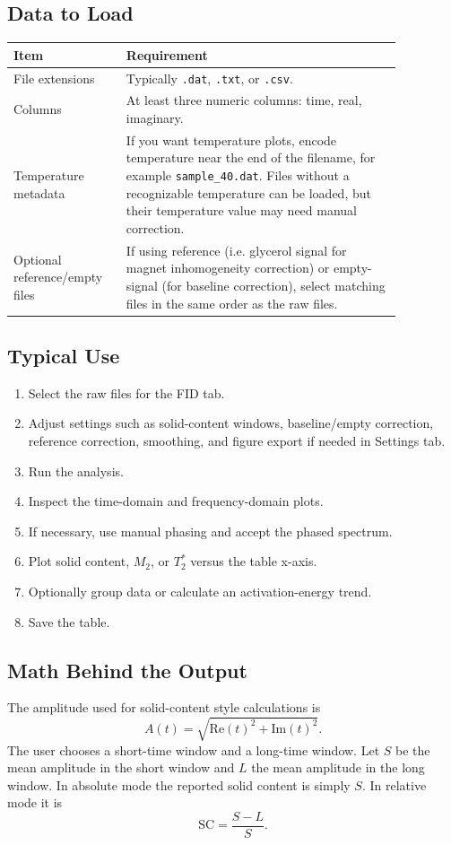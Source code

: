 \documentclass[11pt,a4paper]{article}
\newcommand{\TtwoStar}{\ensuremath{T_2^{\ast}}}
\newcommand{\Mtwo}{\ensuremath{M_2}}
\begin{document}
\subsection{Data to Load}
\begin{longtable}{p{0.23\linewidth}p{0.63\linewidth}}
\toprule
Item & Requirement \\
\midrule
File extensions & Typically \texttt{.dat}, \texttt{.txt}, or \texttt{.csv}. \\
Columns & At least three numeric columns: time, real, imaginary. \\
Temperature metadata & If you want temperature plots, encode temperature near the end of the filename, for example \texttt{sample\_40.dat}. Files without a recognizable temperature can be loaded, but their temperature value may need manual correction. \\
Optional reference/empty files & If using reference (i.e. glycerol signal for magnet inhomogeneity correction) or empty-signal (for baseline correction), select matching files in the same order as the raw files. \\
\bottomrule
\end{longtable}

\subsection{Typical Use}
\begin{enumerate}
  \item Select the raw files for the FID tab.
  \item Adjust settings such as solid-content windows, baseline/empty correction, reference correction, smoothing, and figure export if needed in Settings tab.
  \item Run the analysis.
  \item Inspect the time-domain and frequency-domain plots.
  \item If necessary, use manual phasing and accept the phased spectrum.
  \item Plot solid content, \Mtwo{}, or \TtwoStar{} versus the table x-axis.
  \item Optionally group data or calculate an activation-energy trend.
  \item Save the table.
\end{enumerate}

\subsection{Math Behind the Output}
The amplitude used for solid-content style calculations is
\begin{equation}
A(t)=\sqrt{\mathrm{Re}(t)^2+\mathrm{Im}(t)^2}.
\end{equation}
The user chooses a short-time window and a long-time window. Let \(S\) be the mean amplitude in the short window and \(L\) the mean amplitude in the long window. In absolute mode the reported solid content is simply \(S\). In relative mode it is
\begin{equation}
\mathrm{SC}=\frac{S-L}{S}.
\end{equation}
\end{document}
